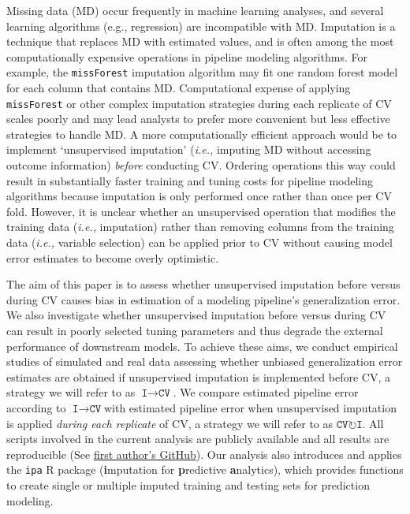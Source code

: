 \documentclass[AMA,STIX1COL,doublespace]{WileyNJD-v2}
\begin{document}
Missing data (MD) occur frequently in machine learning analyses, and
several learning algorithms (e.g., regression) are incompatible with MD.
Imputation is a technique that replaces MD with estimated values, and is
often among the most computationally expensive operations in pipeline
modeling algorithms. For example, the \texttt{missForest} imputation
algorithm may fit one random forest model for each column that contains
MD.\citep{stekhoven2011missforest} Computational expense of applying
\texttt{missForest} or other complex imputation strategies during each
replicate of CV scales poorly and may lead analysts to prefer more
convenient but less effective strategies to handle MD. A more
computationally efficient approach would be to implement `unsupervised
imputation' (\textit{i.e., }imputing MD without accessing outcome
information) \emph{before} conducting CV. Ordering operations this way
could result in substantially faster training and tuning costs for
pipeline modeling algorithms because imputation is only performed once
rather than once per CV fold. However, it is unclear whether an
unsupervised operation that modifies the training data
(\textit{i.e., }imputation) rather than removing columns from the
training data (\textit{i.e., }variable selection) can be applied prior
to CV without causing model error estimates to become overly optimistic.

The aim of this paper is to assess whether unsupervised imputation
before versus during CV causes bias in estimation of a modeling
pipeline's generalization error. We also investigate whether
unsupervised imputation before versus during CV can result in poorly
selected tuning parameters and thus degrade the external performance of
downstream models. To achieve these aims, we conduct empirical studies
of simulated and real data assessing whether unbiased generalization
error estimates are obtained if unsupervised imputation is implemented
before CV, a strategy we will refer to as
$\texttt{I}\!\!\rightarrow\!\texttt{CV}$. We compare estimated pipeline
error according to $\texttt{I}\!\!\rightarrow\!\texttt{CV}$\space with
estimated pipeline error when unsupervised imputation is applied
\emph{during each replicate} of CV, a strategy we will refer to as
$\texttt{CV}\!\circlearrowright\!\texttt{I}$. All scripts involved in
the current analysis are publicly available and all results are
reproducible (See
\href{https://github.com/bcjaeger/Imputation-and-CV}{first author's
GitHub}). Our analysis also introduces and applies the \texttt{ipa} R
package (\textbf{i}mputation for \textbf{p}redictive
\textbf{a}nalytics), which provides functions to create single or
multiple imputed training and testing sets for prediction modeling.
\end{document}
